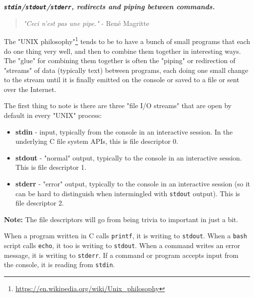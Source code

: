 \documentclass[10pt,]{book}
\renewcommand{\href}[2]{#2\footnote{\url{#1}}}
\numberwithin{figure}{chapter}
\DeclareRobustCommand{\drcmd}[1]{\index{Commands!#1}}
\begin{document}

\textbf{\emph{\texttt{stdin}/\texttt{stdout}/\texttt{stderr}, redirects
and piping between commands.}}

\begin{quote}
\emph{"Ceci n'est pas une pipe."} - René Magritte
\end{quote}

The \href{https://en.wikipedia.org/wiki/Unix_philosophy}{"UNIX
philosophy"} tends to be to have a bunch of small programs that each do
one thing very well, and then to combine them together in interesting
ways. The "glue" for combining them together is often the "piping" or
redirection of "streams" of data (typically text) between programs, each
doing one small change to the stream until it is finally emitted on the
console or saved to a file or sent over the Internet.

The first thing to note is there are three "file I/O streams" that are
open by default in every "UNIX" process:

\begin{itemize}
\item
  \textbf{stdin} - input, typically from the console in an
  interactive session. In the underlying C file system APIs, this is
  file descriptor 0.
\item
  \textbf{stdout} - "normal" output, typically to the
  console in an interactive session. This is file descriptor 1.
\item
  \textbf{stderr} - "error" output, typically to the
  console in an interactive session (so it can be hard to distinguish
  when intermingled with \texttt{stdout} output). This is file
  descriptor 2.
\end{itemize}

\textbf{Note:} The file descriptors will go from being trivia to
important in just a bit.

When a program written in C calls \texttt{printf}, it is writing to
\texttt{stdout}. When a \texttt{bash} script calls
\texttt{echo}\drcmd{echo}, it too is writing to \texttt{stdout}. When a
command writes an error message, it is writing to \texttt{stderr}. If a
command or program accepts input from the console, it is reading from
\texttt{stdin}.
\end{document}
